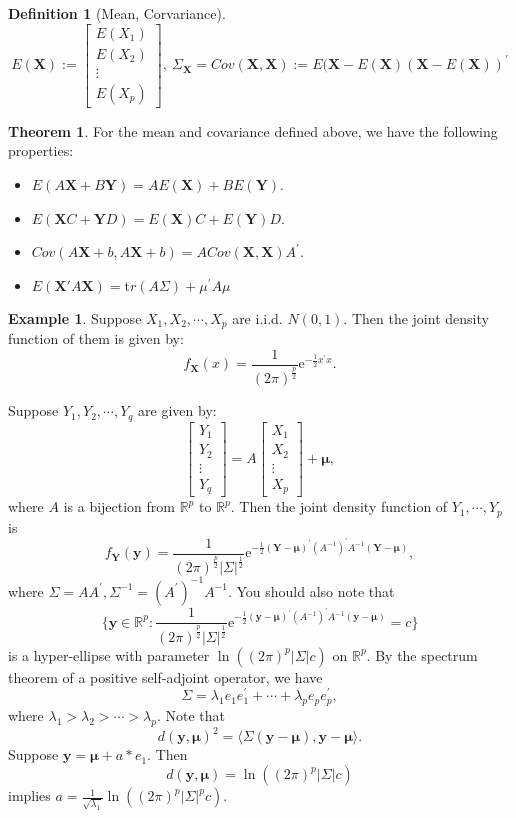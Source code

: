 \documentclass[12pt]{book}
\theoremstyle{definition}
\newtheorem{definition}{Definition}[chapter]
\newtheorem{example}{Example}[chapter]
\newtheorem{theorem}{Theorem}[chapter]
\newcommand{\inner}[2]{{\langle #1,#2\rangle}}
\newcommand{\R}{\mathbb{R}}
\newcommand{\E}{\mathrm{e}}
\newcommand{\X}{\mathbf{X}}
\newcommand{\Y}{\mathbf{Y}}
\begin{document}
\begin{definition}[Mean, Corvariance] \ \\
$$
E(\X) := \begin{bmatrix}
	E(X_1) \\
	E(X_2) \\
	\vdots \\
	E(X_p)
\end{bmatrix}, \
\Sigma_{\X}=Cov(\X,\X):=E(\X-E(\X)(\X-E(\X))^\prime
$$	
\end{definition}

\begin{theorem}
For the mean and covariance defined above, we have the following properties:
\begin{itemize}
	\item $E(A\X+B\Y)=AE(\X)+BE(\Y)$.
	\item $E(\X C +\Y D)=E(\X)C+E(\Y)D$.
	\item $Cov(A\X+b,A\X+b)=ACov(\X,\X)A^\prime$.
	\item $E(\X\prime A\X)=\mathrm tr(A\Sigma)+\mu^\prime A \mu$
\end{itemize}
\end{theorem}

\begin{example}
Suppose $X_1,X_2,\cdots,X_p$ are i.i.d. $N(0,1)$. Then the joint density function of them is given by:
$$
f_{\X}(x)=\frac{1}{(2\pi)^{\frac{p}{2}}}\E^{-\frac{1}{2}x^\prime x}.
$$
\end{example}
Suppose $Y_1,Y_2,\cdots,Y_q$ are given by:
$$
\begin{bmatrix}
	Y_1 \\
	Y_2 \\
	\vdots \\
	Y_q
\end{bmatrix} = A
\begin{bmatrix}
	X_1 \\
	X_2 \\
	\vdots \\ 
	X_p
\end{bmatrix} + \mathbf{\mu},
$$
where $A$ is a bijection from $\R^p$ to $\R^p$. Then the joint density function of $Y_1,\cdots,Y_p$ is 
$$
f_\Y(\mathbf{y})= \frac{1}{(2\pi)^{\frac{p}{2}}|\Sigma|^{\frac{1}{2}}}\E^{-\frac{1}{2}(\Y-\mathbf{\mu})^\prime (A^{-1})^{\prime}A^{-1}(\Y-\mathbf{\mu})},
$$
where $\Sigma=AA^\prime,\Sigma^{-1}=(A^{\prime})^{-1}A^{-1}$. You should also note that 
$$
\{\mathbf y \in \R^p:\frac{1}{(2\pi)^{\frac{p}{2}}|\Sigma|^{\frac{1}{2}}}\E^{-\frac{1}{2}(\mathbf y-\mathbf{\mu})^\prime (A^{-1})^{\prime}A^{-1}(\mathbf y-\mathbf{\mu})} = c \}
$$
is a hyper-ellipse with parameter $\ln ((2\pi)^p|\Sigma|c)$ on $\R^p$. By the spectrum theorem of a positive self-adjoint operator, we have
$$
\Sigma = \lambda_1 e_1 e_1^\prime + \cdots +\lambda_p e_p e_p^\prime,
$$
where $\lambda_1 > \lambda_2 > \cdots > \lambda_p$. Note that 
$$
d(\mathbf y,\mathbf \mu)^2 = \inner{\Sigma(\mathbf y-\mathbf \mu)}{\mathbf y-\mathbf \mu}.
$$
Suppose $\mathbf y = \mathbf \mu + a*e_1$. Then
$$
d(\mathbf y,\mathbf \mu)  = \ln ((2\pi)^p|\Sigma|c)
$$
implies $a = \frac{1}{\sqrt{\lambda_1}} \ln ((2\pi)^p|\Sigma|^pc)$.
\end{document}
